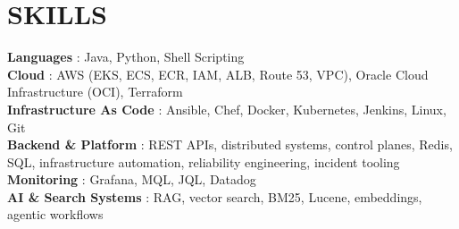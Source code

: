 \documentclass[letterpaper,11pt]{article}
\begin{document}
\section{SKILLS}
\begin{itemize}[leftmargin=0in, label={}]
    \small{\item{
     \textbf{Languages} {: Java, Python, Shell Scripting} \\
     \textbf{Cloud} {: AWS (EKS, ECS, ECR, IAM, ALB, Route 53, VPC), Oracle Cloud Infrastructure (OCI), Terraform} \\
     \textbf{Infrastructure As Code} {: Ansible, Chef, Docker, Kubernetes, Jenkins, Linux, Git} \\
     \textbf{Backend \& Platform} {: REST APIs, distributed systems, control planes, Redis, SQL, infrastructure automation, reliability engineering, incident tooling} \\
     \textbf{Monitoring} {: Grafana, MQL, JQL, Datadog} \\
     \textbf{AI \& Search Systems} {: RAG, vector search, BM25, Lucene, embeddings, agentic workflows}
    }}
\end{itemize}

\end{document}
